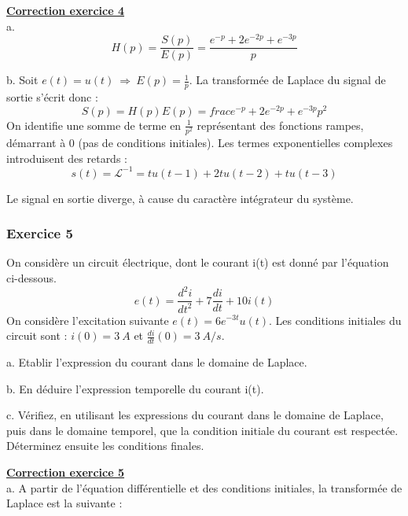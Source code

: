 \documentclass[11pt]{report}
\begin{document}
	\textbf{\underline{Correction exercice 4}}\\
	
	a. \begin{equation*}
	H(p)=\frac{S(p)}{E(p)}=\frac{e^{-p}+2e^{-2p}+e^{-3p}}{p}
	\end{equation*}
	
	b. Soit $e(t)=u(t)~\Rightarrow~E(p)=\frac{1}{p}$. La transformée de Laplace du signal de sortie s'écrit donc :
	\begin{equation*}
	S(p)=H(p)E(p)=frac{e^{-p}+2e^{-2p}+e^{-3p}}{p^2}
	\end{equation*}
	On identifie une somme de terme en $\frac{1}{p^2}$ représentant des fonctions rampes, démarrant à 0 (pas de conditions initiales). Les termes exponentielles complexes introduisent des retards :
	\begin{equation*}
	s(t)=\mathcal{L}^{-1}=tu(t-1)+2tu(t-2)+tu(t-3)
	\end{equation*}
	
	Le signal en sortie diverge, à cause du caractère intégrateur du système.
	
	
	\vspace{1\baselineskip}
	
		
	\subsubsection{Exercice 5}
	
	On considère un circuit électrique, dont le courant i(t) est donné par l'équation ci-dessous.
	\begin{equation*}
		e(t)=\frac{d^{2}i}{dt^{2}}+7\frac{di}{dt}+10i(t)
	\end{equation*}
	On considère l'excitation suivante $e(t)=6e^{-3t}u(t)$. Les conditions initiales du circuit sont : $i(0) = 3~A$ et $\frac{di}{dt}(0)=3~A/s$.
	
	
	a. Etablir l'expression du courant dans le domaine de Laplace.
	
	b. En déduire l'expression temporelle du courant i(t).
	
	c. Vérifiez, en utilisant les expressions du courant dans le domaine de Laplace, puis dans le domaine temporel, que la condition initiale du courant est respectée. Déterminez ensuite les conditions finales.
	
	\vspace{1\baselineskip}
	
	\textbf{\underline{Correction exercice 5}}\\
	a. A partir de l'équation différentielle et des conditions initiales, la transformée de Laplace est la suivante :
	
\end{document}
